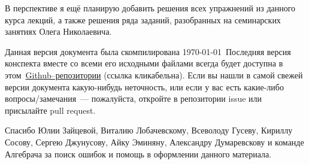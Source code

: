 В перспективе я ещё планирую добавить решения всех упражнений из данного курса лекций, а также решения ряда заданий, разобранных на семинарских занятиях Олега Николаевича.

Данная версия документа была скомпилирована \today~Последняя версия конспекта вместе со всеми его исходными файлами всегда будет доступна в этом~\href{https://github.com/gevartrix/msu-numbertheory-conspect}{Github--репозитории} (ссылка кликабельна). Если вы нашли в самой свежей версии документа какую-нибудь неточность, или если у вас есть какие-либо вопросы/замечания --- пожалуйста, откройте в репозитории issue или присылайте pull request.

Спасибо Юлии Зайцевой, Виталию Лобачевскому, Всеволоду Гусеву, Кириллу Сосову, Сергею Джунусову, Айку Эминяну, Александру Думаревскову и команде Алгебрача за поиск ошибок и помощь в оформлении данного материала.

\normalfont
\newpage
